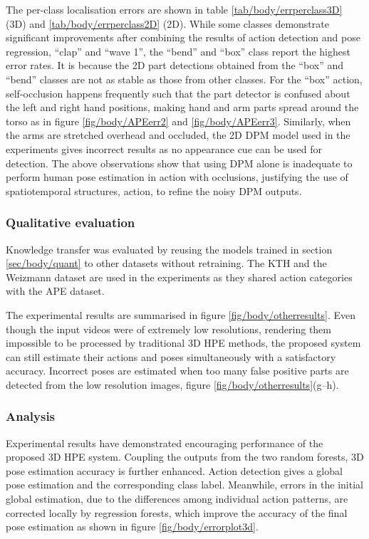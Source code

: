 



The per-class localisation errors are shown in table \ref{tab/body/errperclass3D} (3D) and \ref{tab/body/errperclass2D} (2D). While some classes demonstrate significant improvements after combining the results of action detection and pose regression, \eg ``clap'' and ``wave 1'', the ``bend'' and ``box'' class report the highest error rates. It is because the 2D part detections obtained from the ``box'' and ``bend'' classes are not as stable as those from other classes. For the ``box'' action, self-occlusion happens frequently such that the part detector is confused about the left and right hand positions, making hand and arm parts spread around the torso as in figure \ref{fig/body/APEerr2} and \ref{fig/body/APEerr3}. 
Similarly, when the arms are stretched overhead and occluded, the 2D DPM model used in the experiments gives incorrect results as no appearance cue can be used for detection. The above observations show that using DPM alone is inadequate to perform human pose estimation in action with occlusions, justifying the use of spatiotemporal structures, \ie action, to refine the noisy DPM outputs.  



\subsubsection{Qualitative evaluation}

Knowledge transfer was evaluated by reusing the models trained in section \ref{sec/body/quant} to other datasets without retraining.
The KTH \cite{Schuldt2004} and the Weizmann \cite{Gorelick2007} dataset are used in the experiments as they shared action categories with the APE dataset. 

The experimental results are summarised in figure \ref{fig/body/otherresults}. Even though the input videos were of extremely low resolutions, rendering them impossible to be processed by traditional 3D HPE methods, the proposed system can still estimate their actions and poses simultaneously with a satisfactory accuracy. 
Incorrect poses are estimated when too many false positive parts are detected from the low resolution images, \eg figure \ref{fig/body/otherresults}(g--h). 

\subsubsection{Analysis}
Experimental results have demonstrated encouraging performance of the proposed 3D HPE system.  
Coupling the outputs from the two random forests, 3D pose estimation accuracy is further enhanced. Action detection gives a global pose estimation and the corresponding class label. Meanwhile, errors in the initial global estimation, due to the differences among individual action patterns, are corrected locally by regression forests, which improve the accuracy of the final pose estimation as shown in figure \ref{fig/body/errorplot3d}. 

